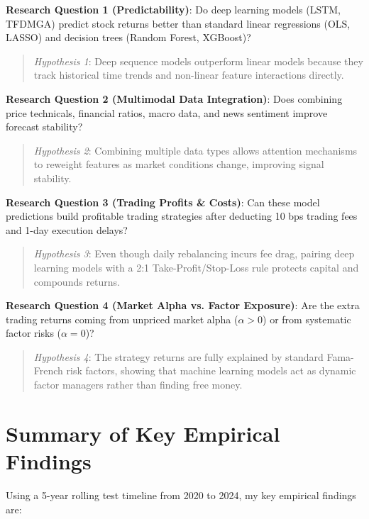 \noindent \textbf{Research Question 1 (Predictability)}: Do deep learning models (LSTM, TFDMGA) predict stock returns better than standard linear regressions (OLS, LASSO) and decision trees (Random Forest, XGBoost)?
\begin{quote}
\textit{Hypothesis 1}: Deep sequence models outperform linear models because they track historical time trends and non-linear feature interactions directly.
\end{quote}

\vspace{0.2cm}
\noindent \textbf{Research Question 2 (Multimodal Data Integration)}: Does combining price technicals, financial ratios, macro data, and news sentiment improve forecast stability?
\begin{quote}
\textit{Hypothesis 2}: Combining multiple data types allows attention mechanisms to reweight features as market conditions change, improving signal stability.
\end{quote}

\vspace{0.2cm}
\noindent \textbf{Research Question 3 (Trading Profits \& Costs)}: Can these model predictions build profitable trading strategies after deducting 10 bps trading fees and 1-day execution delays?
\begin{quote}
\textit{Hypothesis 3}: Even though daily rebalancing incurs fee drag, pairing deep learning models with a 2:1 Take-Profit/Stop-Loss rule protects capital and compounds returns.
\end{quote}

\vspace{0.2cm}
\noindent \textbf{Research Question 4 (Market Alpha vs. Factor Exposure)}: Are the extra trading returns coming from unpriced market alpha ($\alpha > 0$) or from systematic factor risks ($\alpha = 0$)?
\begin{quote}
\textit{Hypothesis 4}: The strategy returns are fully explained by standard Fama-French risk factors, showing that machine learning models act as dynamic factor managers rather than finding free money.
\end{quote}

\section{Summary of Key Empirical Findings}
Using a 5-year rolling test timeline from 2020 to 2024, my key empirical findings are:


